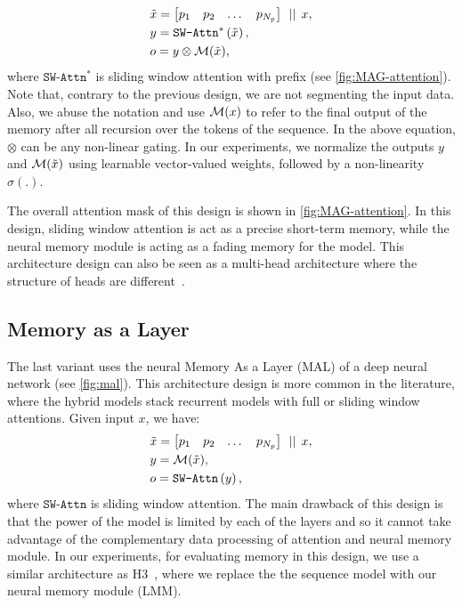 \begin{align}
    &\tilde{x} = \begin{bmatrix}
    p_1 & p_2 & \dots & p_{N_p}
\end{bmatrix} \:\: || \:\: x, \\
    &y = \texttt{SW-Attn}^*\left( \tilde{x} \right), \\
    &o = y \otimes \mathcal{M}(\tilde{x}),
\end{align}
where $\texttt{SW-Attn}^*$ is sliding window attention with prefix (see \autoref{fig:MAG-attention}). Note that, contrary to the previous design, we are not segmenting the input data. Also, we abuse the notation and use $\mathcal{M}(x)$ to refer to the final output of the memory after all recursion over the tokens of the sequence. In the above equation, $\otimes$ can be any non-linear gating. In our experiments, we normalize the outputs $y$ and $ \mathcal{M}(\tilde{x})$ using learnable vector-valued weights, followed by a non-linearity $\sigma(.)$. 

The overall attention mask of this design is shown in \autoref{fig:MAG-attention}. In this design, sliding window attention is act as a precise short-term memory, while the neural memory module is acting as a fading memory for the model. This architecture design can also be seen as a multi-head architecture where the structure of heads are different~\citep{dong2024hymba}.  








\subsection{Memory as a Layer}
The last variant uses the neural Memory As a Layer (MAL) of a deep neural network (see \autoref{fig:mal}). This architecture design is more common in the literature, where the hybrid models stack recurrent models with full or sliding window attentions. Given input $x$, we have:
\begin{align}
    &\tilde{x} = \begin{bmatrix}
    p_1 & p_2 & \dots & p_{N_p}
\end{bmatrix} \:\: || \:\: x, \\
    &y = \mathcal{M}(\tilde{x}), \\
    &o = \texttt{SW-Attn} \left( y \right),
\end{align}
where $\texttt{SW-Attn}$ is sliding window attention. The main drawback of this design is that the power of the model is limited by each of the layers and so it cannot take advantage of the complementary data processing of attention and neural memory module. In our experiments, for evaluating memory in this design, we use a similar architecture as H3~\citep{fu2023hungry}, where we replace the the sequence model with our neural memory module (LMM).





